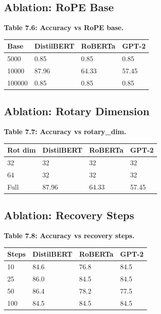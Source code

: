 \subsection{Ablation: RoPE Base}

\textbf{Table 7.6: Accuracy vs RoPE base.}

\begin{table}[H]
\centering
\small
\begin{tabular}{llll}
\toprule
\textbf{Base} & \textbf{DistilBERT} & \textbf{RoBERTa} & \textbf{GPT-2} \\
\midrule
5000 & 0.85 & 0.85 & 0.85 \\
10000 & 87.96 & 64.33 & 57.45 \\
100000 & 0.85 & 0.85 & 0.85 \\
\bottomrule
\end{tabular}
\end{table}

\subsection{Ablation: Rotary Dimension}

\textbf{Table 7.7: Accuracy vs rotary\_dim.}

\begin{table}[H]
\centering
\small
\begin{tabular}{llll}
\toprule
\textbf{Rot dim} & \textbf{DistilBERT} & \textbf{RoBERTa} & \textbf{GPT-2} \\
\midrule
32 & 32 & 32 & 32 \\
64 & 32 & 32 & 32 \\
Full & 87.96 & 64.33 & 57.45 \\
\bottomrule
\end{tabular}
\end{table}

\subsection{Ablation: Recovery Steps}

\textbf{Table 7.8: Accuracy vs recovery steps.}

\begin{table}[H]
\centering
\small
\begin{tabular}{llll}
\toprule
\textbf{Steps} & \textbf{DistilBERT} & \textbf{RoBERTa} & \textbf{GPT-2} \\
\midrule
10 & 84.6 & 76.8 & 84.5 \\
25 & 86.0 & 84.5 & 84.5 \\
50 & 86.4 & 78.2 & 77.5 \\
100 & 84.5 & 84.5 & 84.5 \\
\bottomrule
\end{tabular}
\end{table}

